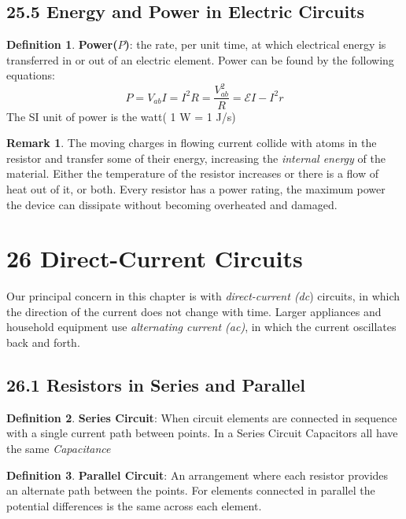 \documentclass[12pt]{amsart}
\theoremstyle{definition}
\newtheorem{definition}{Definition} %
\newtheorem*{remark}{Remark}        %
\numberwithin{equation}{theorem}    %
\begin{document}
\subsection*{25.5 Energy and Power in Electric Circuits}

\begin{definition}
    \textbf{Power($P$)}:
    the rate, per unit time, at which electrical energy is transferred in or out of
    an electric element. Power can be found by the following equations:
    $$ P = V_{ab}I = I^2R = \frac{V_{ab}^2}{R} = \mathcal{E}I-I^2r $$
    The SI unit of power is the watt( 1 W = 1 J/s)
    \begin{remark}
        The moving charges in flowing current collide with atoms in the resistor and transfer 
        some of their energy, increasing the \textit{internal energy} of the material. 
        Either the temperature of the resistor increases or there is a flow of heat out of it, or both.  
        Every resistor has a power rating, the maximum power the device can 
        dissipate without becoming overheated and damaged.
    \end{remark}

\end{definition}

\section*{26 Direct-Current Circuits}
Our principal concern in this chapter is with \textit{direct-current (dc}) circuits, 
in which the direction of the current does not change with time. Larger appliances
and household equipment use \textit{alternating current (ac)}, in which the current oscillates back and forth.

\subsection*{26.1 Resistors in Series and Parallel}

\begin{definition}
    \textbf{Series Circuit}:
    When circuit elements are connected in sequence with a single current path 
    between points. In a Series Circuit Capacitors all have the same \textit{Capacitance}
\end{definition}

\begin{definition}
    \textbf{Parallel Circuit}:
    An arrangement where each resistor provides an alternate path between the points. 
    For elements connected in parallel the potential differences is the same across each element.
\end{definition}
\end{document}
